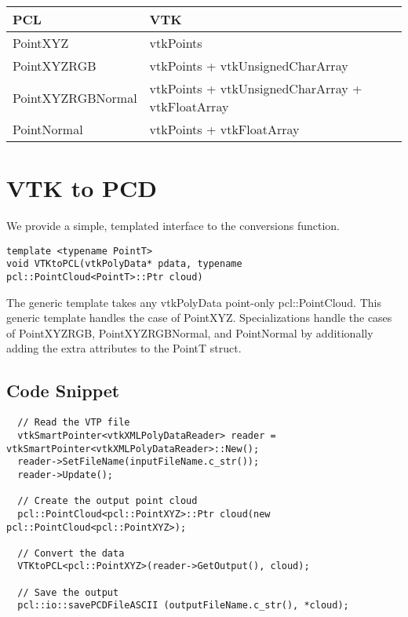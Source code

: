 \documentclass{ComputationalAlgorithmsArticle}
\begin{document}
\begin{center}
 
\begin{tabular}{ l | l }
  PCL & VTK\\
  \hline
  PointXYZ & vtkPoints\\
  PointXYZRGB & vtkPoints + vtkUnsignedCharArray \\
  PointXYZRGBNormal & vtkPoints + vtkUnsignedCharArray + vtkFloatArray\\
  PointNormal & vtkPoints + vtkFloatArray\\
\end{tabular}

\end{center}


\section{VTK to PCD}
We provide a simple, templated interface to the conversions function.
\begin{verbatim}
template <typename PointT> 
void VTKtoPCL(vtkPolyData* pdata, typename pcl::PointCloud<PointT>::Ptr cloud)
\end{verbatim}

The generic template takes any vtkPolyData point-only pcl::PointCloud. This generic template handles the case of PointXYZ. Specializations handle the cases of PointXYZRGB, PointXYZRGBNormal, and PointNormal by additionally adding the extra attributes to the PointT struct.

\subsection{Code Snippet}

\begin{verbatim}
  // Read the VTP file
  vtkSmartPointer<vtkXMLPolyDataReader> reader = vtkSmartPointer<vtkXMLPolyDataReader>::New();
  reader->SetFileName(inputFileName.c_str());
  reader->Update();
  
  // Create the output point cloud
  pcl::PointCloud<pcl::PointXYZ>::Ptr cloud(new pcl::PointCloud<pcl::PointXYZ>);

  // Convert the data
  VTKtoPCL<pcl::PointXYZ>(reader->GetOutput(), cloud);
 
  // Save the output
  pcl::io::savePCDFileASCII (outputFileName.c_str(), *cloud);
\end{verbatim}

\end{document}
